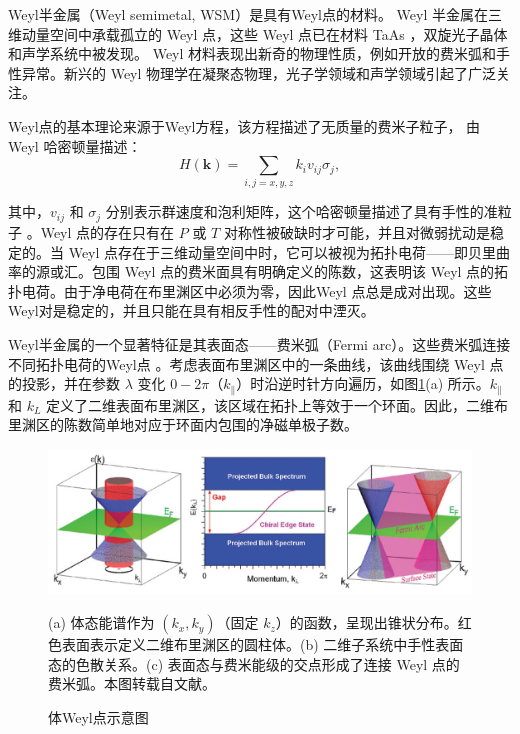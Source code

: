 Weyl半金属（Weyl semimetal, WSM）是具有Weyl点的材料\cite{wan2011topological}。 Weyl 半金属在三维动量空间中承载孤立的 Weyl 点，这些 Weyl 点已在材料 TaAs\cite{lv2015experimental,xu2015discovery} ，双旋光子晶体\cite{lu2015experimental}和声学系统\cite{li2018weyl,ge2018experimental}中被发现。 Weyl 材料表现出新奇的物理性质，例如开放的费米弧\cite{wan2011topological}和手性异常\cite{nielsen1983adler}。新兴的 Weyl 物理学在凝聚态物理，光子学领域和声学领域引起了广泛关注。

Weyl点的基本理论来源于Weyl方程，该方程描述了无质量的费米子粒子， 由 Weyl 哈密顿量\cite{weyl1929electron}描述：
\begin{equation}
H(\mathbf{k}) = \sum_{i,j=x,y,z} k_i v_{ij} \sigma_j,
\end{equation}

其中，\( v_{ij} \) 和 \( \sigma_j \) 分别表示群速度和泡利矩阵，这个哈密顿量描述了具有手性的准粒子 。Weyl 点的存在只有在 \( P \) 或 \( T \) 对称性被破缺时才可能，并且对微弱扰动是稳定的。当 Weyl 点存在于三维动量空间中时，它可以被视为拓扑电荷——即贝里曲率的源或汇。包围 Weyl 点的费米面具有明确定义的陈数，这表明该 Weyl 点的拓扑电荷。由于净电荷在布里渊区中必须为零，因此Weyl 点总是成对出现。这些Weyl对是稳定的，并且只能在具有相反手性的配对中湮灭。

Weyl半金属的一个显著特征是其表面态——费米弧（Fermi arc）。这些费米弧连接不同拓扑电荷的Weyl点 。考虑表面布里渊区中的一条曲线，该曲线围绕 Weyl 点的投影，并在参数 \( \lambda \) 变化 \( 0 - 2\pi \)（\( k_\parallel \)）时沿逆时针方向遍历，如图\ref{fig:FermiArc}(a) 所示。\( k_\parallel \) 和 \( k_L \) 定义了二维表面布里渊区，该区域在拓扑上等效于一个环面。因此，二维布里渊区的陈数简单地对应于环面内包围的净磁单极子数。

\begin{figure}[htbp]
    \centering
    \includegraphics[width=1\linewidth]{figure/FracHaldExp/FermiArc.png}
    \caption{体Weyl点示意图}
    \label{fig:enter-label}(a) 体态能谱作为 \( (k_x, k_y) \)（固定 \( k_z \)）的函数，呈现出锥状分布。红色表面表示定义二维布里渊区的圆柱体。(b) 二维子系统中手性表面态的色散关系。(c) 表面态与费米能级的交点形成了连接 Weyl 点的费米弧。本图转载自文献\cite{wan2011topological}。
    \label{fig:FermiArc}
\end{figure}

